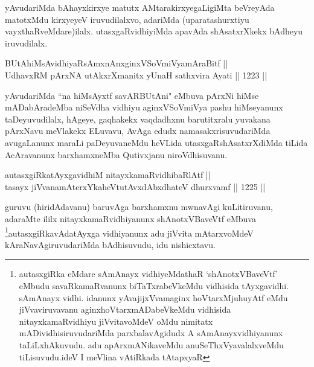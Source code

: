\begin{artha}
yAvudariMda bAhayxkirxye matutx AMtarakirxyegaLigiMta beVreyAda matotxMdu kirxyeyeV iruvudilalxvo, adariMda (uparatashurxtiyu vayxthaRveMdare)ilalx. utasxgaRvidhiyiMda apavAda shAsatxrXkekx bAdheyu iruvudilalx.
\end{artha}


\begin{shl}
BUtAhiMsAvidhiyaRsAmxnAnxginxVSoVmiVyamAraBitf || \\
UdhavxRM pArxNA utAkxrXmanitx yUnaH sathxvira Ayati \hfill || 1223 ||  
\end{shl}

\begin{artha}
yAvudariMda ``na hiMsAyxtf savARBUtAni" eMbuva pArxNi hiMse mADabAradeMba niSeVdha vidhiyu aginxVSoVmiVya pashu hiMseyanunx taDeyuvudilalx, hAgeye, gaqhakekx vaqdadhxnu barutitxralu yuvakana pArxNavu meVlakekx ELuvavu, AvAga edudx namasakxrisuvudariMda avugaLanunx maraLi paDeyuvaneMdu heVLida utasxgaRshAsatxrXdiMda tiLida AcAravanunx barxhamxneMba Qutivxjanu niroVdhisuvanu.
\end{artha}


\begin{shl}
autasxgiRkatAyxgavidhiM nitayxkamaRvidhibaRlAtf || \\
tasayx jiVvanamAterxYkaheVtutAvxdAbxdhateV dhurxvamf \hfill || 1225 ||  
\end{shl}

\begin{artha}
guruvu (hiridAdavanu) baruvAga barxhamxnu mwnavAgi kuLitiruvanu, adaraMte ililx nitayxkamaRvidhiyanunx shAnotxVBaveVtf eMbuva \footnote{autasxgiRka eMdare sAmAnayx vidhiyeMdathaR `shAnotxVBaveVtf' eMbudu savaRkamaRvanunx biTaTxrabeVkeMdu vidhisida tAyxgavidhi. sAmAnayx vidhi. idanunx yAvajijxVvamaginx hoVtarxMjuhuyAtf eMdu jiVvaviruvavanu aginxhoVtarxmADabeVkeMdu vidhisida nitayxkamaRvidhiyu jiVvitavoMdeV oMdu nimitatx mADividhisiruvudariMda parxbalavAgidudx A sAmAnayxvidhiyanunx taLiLxhAkuvudu. adu apArxmANikaveMdu anuSeThxVyavalalxveMdu tiLisuvudu.ideV I meVlina vAtiRkada tAtapxyaR}autasxgiRkavAdatAyxga vidhiyanunx adu jiVvita mAtarxvoMdeV kAraNavAgiruvudariMda bAdhisuvudu, idu nishicxtavu.
\end{artha}

